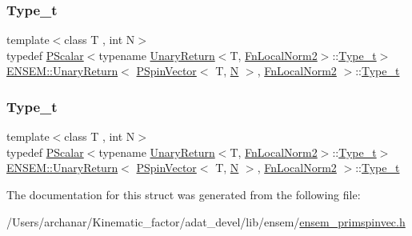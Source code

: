 \subsubsection{\texorpdfstring{Type\_t}{Type\_t}\hspace{0.1cm}{\footnotesize\ttfamily [1/2]}}
{\footnotesize\ttfamily template$<$class T , int N$>$ \\
typedef \mbox{\hyperlink{classENSEM_1_1PScalar}{P\+Scalar}}$<$typename \mbox{\hyperlink{structENSEM_1_1UnaryReturn}{Unary\+Return}}$<$T, \mbox{\hyperlink{structENSEM_1_1FnLocalNorm2}{Fn\+Local\+Norm2}}$>$\+::\mbox{\hyperlink{structENSEM_1_1UnaryReturn_3_01PSpinVector_3_01T_00_01N_01_4_00_01FnLocalNorm2_01_4_a0b0ee565a748d83ef4185e3d382d81de}{Type\+\_\+t}}$>$ \mbox{\hyperlink{structENSEM_1_1UnaryReturn}{E\+N\+S\+E\+M\+::\+Unary\+Return}}$<$ \mbox{\hyperlink{classENSEM_1_1PSpinVector}{P\+Spin\+Vector}}$<$ T, \mbox{\hyperlink{operator__name__util_8cc_a7722c8ecbb62d99aee7ce68b1752f337}{N}} $>$, \mbox{\hyperlink{structENSEM_1_1FnLocalNorm2}{Fn\+Local\+Norm2}} $>$\+::\mbox{\hyperlink{structENSEM_1_1UnaryReturn_3_01PSpinVector_3_01T_00_01N_01_4_00_01FnLocalNorm2_01_4_a0b0ee565a748d83ef4185e3d382d81de}{Type\+\_\+t}}}

\mbox{\label{structENSEM_1_1UnaryReturn_3_01PSpinVector_3_01T_00_01N_01_4_00_01FnLocalNorm2_01_4_a0b0ee565a748d83ef4185e3d382d81de}} 
\subsubsection{\texorpdfstring{Type\_t}{Type\_t}\hspace{0.1cm}{\footnotesize\ttfamily [2/2]}}
{\footnotesize\ttfamily template$<$class T , int N$>$ \\
typedef \mbox{\hyperlink{classENSEM_1_1PScalar}{P\+Scalar}}$<$typename \mbox{\hyperlink{structENSEM_1_1UnaryReturn}{Unary\+Return}}$<$T, \mbox{\hyperlink{structENSEM_1_1FnLocalNorm2}{Fn\+Local\+Norm2}}$>$\+::\mbox{\hyperlink{structENSEM_1_1UnaryReturn_3_01PSpinVector_3_01T_00_01N_01_4_00_01FnLocalNorm2_01_4_a0b0ee565a748d83ef4185e3d382d81de}{Type\+\_\+t}}$>$ \mbox{\hyperlink{structENSEM_1_1UnaryReturn}{E\+N\+S\+E\+M\+::\+Unary\+Return}}$<$ \mbox{\hyperlink{classENSEM_1_1PSpinVector}{P\+Spin\+Vector}}$<$ T, \mbox{\hyperlink{operator__name__util_8cc_a7722c8ecbb62d99aee7ce68b1752f337}{N}} $>$, \mbox{\hyperlink{structENSEM_1_1FnLocalNorm2}{Fn\+Local\+Norm2}} $>$\+::\mbox{\hyperlink{structENSEM_1_1UnaryReturn_3_01PSpinVector_3_01T_00_01N_01_4_00_01FnLocalNorm2_01_4_a0b0ee565a748d83ef4185e3d382d81de}{Type\+\_\+t}}}



The documentation for this struct was generated from the following file\+:\begin{DoxyCompactItemize}
\item 
/\+Users/archanar/\+Kinematic\+\_\+factor/adat\+\_\+devel/lib/ensem/\mbox{\hyperlink{lib_2ensem_2ensem__primspinvec_8h}{ensem\+\_\+primspinvec.\+h}}\end{DoxyCompactItemize}

